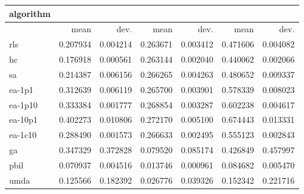 \begin{tabular}{@{}l*{6}{>{{}}N{1}{2}}@{}}
\toprule
{algorithm} &  &  &  \\
\midrule
& {mean} & {dev.} & {mean} & {dev.} & {mean} & {dev.} \\
\midrule
rls & 0.207934 & 0.004214 & 0.263671 & 0.003412 & 0.471606 & 0.004082 \\
 hc & 0.176918 & 0.000561 & 0.263144 & 0.002040 & 0.440062 & 0.002066 \\
 sa & 0.214387 & 0.006156 & 0.266265 & 0.004263 & 0.480652 & 0.009337 \\
 ea-1p1 & 0.312639 & 0.006119 & 0.265700 & 0.003901 & 0.578339 & 0.008023 \\
 ea-1p10 & 0.333384 & 0.001777 & 0.268854 & 0.003287 & 0.602238 & 0.004617 \\
 ea-10p1 & 0.402273 & 0.010806 & 0.272170 & 0.005100 & 0.674443 & 0.013331 \\
 ea-1c10 & 0.288490 & 0.001573 & 0.266633 & 0.002495 & 0.555123 & 0.002843 \\
 ga & 0.347329 & 0.372828 & 0.079520 & 0.085174 & 0.426849 & 0.457997 \\
 pbil & 0.070937 & 0.004516 & 0.013746 & 0.000961 & 0.084682 & 0.005470 \\
 umda & 0.125566 & 0.182392 & 0.026776 & 0.039326 & 0.152342 & 0.221716 \\
 \bottomrule
\end{tabular}
